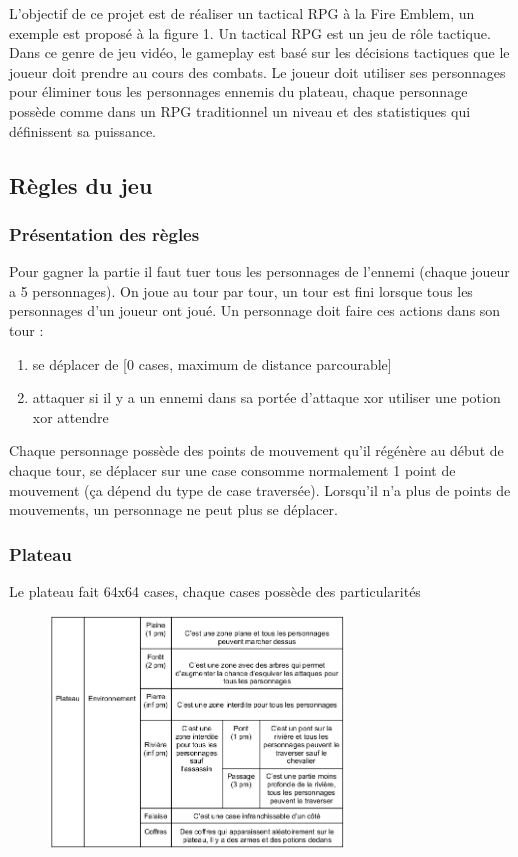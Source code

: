 \documentclass[a4paper,12pt]{article}
\begin{document}
L'objectif de ce projet est de réaliser un tactical RPG à la Fire Emblem, un exemple est proposé à la figure 1. Un tactical RPG est un jeu de rôle tactique. Dans ce genre de jeu vidéo, le gameplay est basé sur les décisions tactiques que le joueur doit prendre au cours des combats. Le joueur doit utiliser ses personnages pour éliminer tous les personnages ennemis du plateau, chaque personnage possède comme dans un RPG traditionnel un niveau et des statistiques qui définissent sa puissance. 

\subsection{Règles du jeu}
\subsubsection{Présentation des règles}
Pour gagner la partie il faut tuer tous les personnages de l'ennemi (chaque joueur a 5 personnages). On joue au tour par tour, un tour est fini lorsque tous les personnages d’un joueur ont joué. 
Un personnage doit faire ces actions dans son tour :
\begin{enumerate}
  \item se déplacer de [0 cases, maximum de distance parcourable]
  \item attaquer si il y a un ennemi dans sa portée d’attaque xor utiliser une potion xor attendre 
\end{enumerate}
Chaque personnage possède des points de mouvement qu’il régénère au début de chaque tour, se déplacer sur une case consomme normalement 1 point de mouvement (ça dépend du type de case traversée). Lorsqu’il n’a plus de points de mouvements, un personnage ne peut plus se déplacer.
\subsubsection{Plateau}
Le plateau fait 64x64 cases, chaque cases possède des particularités
\begin{figure}[ht]
\begin{center}
\includegraphics[width=0.7\textwidth]{tableauplateau.png}
\end{center}
\end{figure}
\newpage
\end{document}
